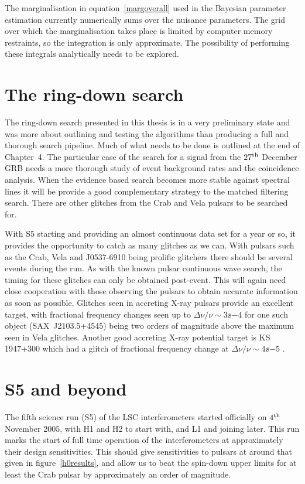 The marginalisation in equation~\ref{margoverall} used in the Bayesian parameter estimation
currently numerically sums over the nuisance parameters. The grid over which the marginalisation
takes place is limited by computer memory restraints, so the integration is only approximate. The
possibility of performing these integrals analytically needs to be explored.

\section{The ring-down search}
The ring-down search presented in this thesis is in a very preliminary state and was more about
outlining and testing the algorithms than producing a full and thorough search pipeline. Much of
what needs to be done is outlined at the end of Chapter~4. The particular case of the search for a
signal from the $27^{\rm th}$ December GRB needs a more thorough study of event background rates
and the coincidence analysis. When the evidence based search becomes more stable against spectral
lines it will be provide a good complementary strategy to the matched filtering search. There are
other glitches from the Crab and Vela pulsars to be searched for.

With S5 starting and providing an almost continuous data set for a year or so, it provides the
opportunity to catch as many glitches as we can. With pulsars such as the Crab, Vela and J0537-6910
being prolific glitchers there should be several events during the run. As with the known pulsar
continuous wave search, the timing for these glitches can only be obtained post-event. This will
again need close cooperation with those observing the pulsars to obtain accurate information as
soon as possible. Glitches seen in accreting X-ray pulsars provide an excellent target, with
fractional frequency changes seen up to $\Delta\nu/\nu \sim 3\ee{-4}$ for one such object
(SAX~J2103.5+4545) \cite{Stark:2004} being two orders of magnitude above the maximum seen in Vela
glitches. Another good accreting X-ray potential target is KS 1947+300 which had a glitch of
fractional frequency change at $\Delta\nu/\nu \sim 4\ee{-5}$ \cite{Galloway:2004}.

\section{S5 and beyond}
The fifth science run (S5) of the LSC interferometers started officially on $4^{\rm th}$ November
2005, with H1 and H2 to start with, and L1 and \geo joining later. This run marks the start of full
time operation of the interferometers at approximately their design sensitivities. This should give
sensitivities to pulsars at around that given in figure~\ref{h0results}, and allow us to beat the
spin-down upper limits for at least the Crab pulsar by approximately an order of magnitude.

